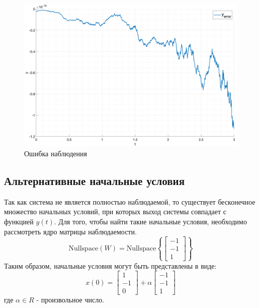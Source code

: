 \begin{figure}
    \centering
    \includegraphics[width=\textwidth]{media/plots/task4_error.png}
    \caption{Ошибка наблюдения}
    \label{fig:task4_estimation}
\end{figure}

\FloatBarrier
\subsection{Альтернативные начальные условия} 
Так как система не является полностью наблюдаемой, то существует бесконечное множество начальных условий,
при которых выход системы совпадает с функцией $y(t)$. Для того, чтобы найти такие начальные условия, необходимо
рассмотреть ядро матрицы наблюдаемости.
\begin{equation}
    \text{Nullspace}(W) =  \text{Nullspace}\left\{\begin{bmatrix}
        -1 \\ -1 \\ 1
    \end{bmatrix}  \right\}
\end{equation}
Таким образом, начальные условия могут быть представлены в виде: 
\begin{equation}
    x(0) = \begin{bmatrix}
        1 \\ -1 \\ 0
    \end{bmatrix} + \alpha \begin{bmatrix}
        -1 \\ -1 \\ 1
    \end{bmatrix}
\end{equation}
где $\alpha \in R$ - произвольное число.


